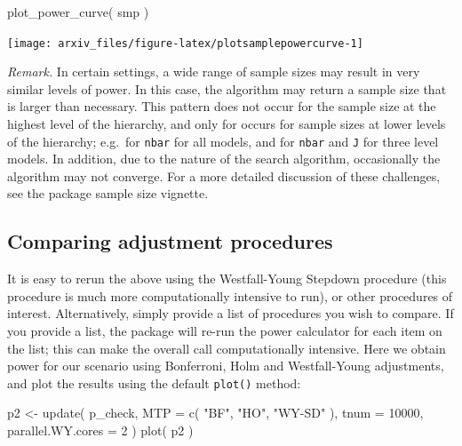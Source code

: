 \documentclass{article}
\newenvironment{Shaded}{\begin{snugshade}}{\end{snugshade}}
\newcommand{\AttributeTok}[1]{\textcolor[rgb]{0.77,0.63,0.00}{#1}}
\newcommand{\DecValTok}[1]{\textcolor[rgb]{0.00,0.00,0.81}{#1}}
\newcommand{\FunctionTok}[1]{\textcolor[rgb]{0.00,0.00,0.00}{#1}}
\newcommand{\NormalTok}[1]{#1}
\newcommand{\OtherTok}[1]{\textcolor[rgb]{0.56,0.35,0.01}{#1}}
\newcommand{\StringTok}[1]{\textcolor[rgb]{0.31,0.60,0.02}{#1}}
\begin{document}
\begin{Shaded}
\begin{Highlighting}[]
\FunctionTok{plot\_power\_curve}\NormalTok{( smp )}
\end{Highlighting}
\end{Shaded}

\begin{center}\texttt{[image: arxiv\_files/figure-latex/plotsamplepowercurve-1]} \end{center}

\emph{Remark.} In certain settings, a wide range of sample sizes may
result in very similar levels of power. In this case, the algorithm may
return a sample size that is larger than necessary. This pattern does
not occur for the sample size at the highest level of the hierarchy, and
only for occurs for sample sizes at lower levels of the hierarchy;
e.g.~for \texttt{nbar} for all models, and for \texttt{nbar} and
\texttt{J} for three level models. In addition, due to the nature of the
search algorithm, occasionally the algorithm may not converge. For a
more detailed discussion of these challenges, see the package sample
size vignette.

\subsection{Comparing adjustment procedures}

It is easy to rerun the above using the Westfall-Young Stepdown
procedure (this procedure is much more computationally intensive to
run), or other procedures of interest. Alternatively, simply provide a
list of procedures you wish to compare. If you provide a list, the
package will re-run the power calculator for each item on the list; this
can make the overall call computationally intensive. Here we obtain
power for our scenario using Bonferroni, Holm and Westfall-Young
adjustments, and plot the results using the default \texttt{plot()}
method:

\begin{Shaded}
\begin{Highlighting}[]
\NormalTok{p2 }\OtherTok{\textless{}{-}} \FunctionTok{update}\NormalTok{( p\_check,}
              \AttributeTok{MTP =} \FunctionTok{c}\NormalTok{( }\StringTok{"BF"}\NormalTok{, }\StringTok{"HO"}\NormalTok{, }\StringTok{"WY{-}SD"}\NormalTok{ ),}
              \AttributeTok{tnum =} \DecValTok{10000}\NormalTok{,}
              \AttributeTok{parallel.WY.cores =} \DecValTok{2}\NormalTok{ )}
\FunctionTok{plot}\NormalTok{( p2 )}
\end{Highlighting}
\end{Shaded}
\end{document}
